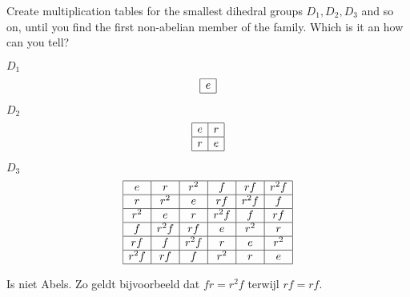 \begin{questions}
	
	\question Create multiplication tables for the smallest dihedral groups $D_1, D_2, D_3$ and so on, until you find the first non-abelian member of the family. Which is it an how can you tell?
	\begin{solution}
		\par $D_1$
		\[
			\begin{array}{|c|}
			\hline
			e\\
			\hline
			\end{array}
		\]
		\par $D_2$
		\[
			\begin{array}{|c|c|}
			\hline
			e& r\\
			\hline
			r & e\\
			\hline
			\end{array}
		\]
		\par $D_3$
		\[
			\begin{array}{|c|c|c|c|c|c|}
			\hline
			e & r & r^2 & f & rf & r^2f\\
			\hline
			r & r^2 & e & rf & r^2 f & f\\
			\hline
			r^2 & e & r & r^2f & f & rf\\
			\hline
			f & r^2f & rf & e & r^2 & r\\
			\hline
			rf & f & r^2f & r & e & r^2\\
			\hline
			r^2f & rf & f & r^2 & r & e\\
			\hline 
			\end{array}
		\]
		\par Is niet Abels. Zo geldt bijvoorbeeld dat $fr = r^2f$ terwijl $rf = rf$.
	\end{solution}
	

\end{questions}
